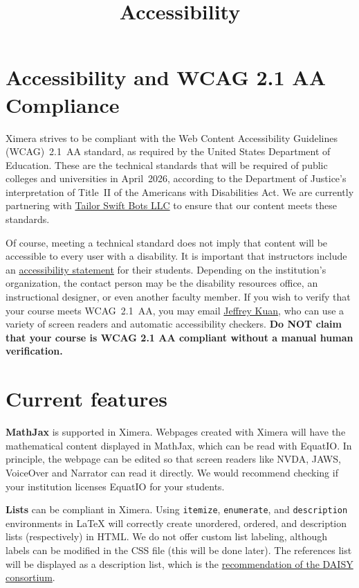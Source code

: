 \documentclass{ximera}
\title{Accessibility}
\begin{document}
\begin{abstract}
\end{abstract}
\maketitle

\section*{Accessibility and WCAG 2.1 AA Compliance}

Ximera strives to be compliant with the Web Content Accessibility Guidelines (WCAG)~2.1~AA standard, as required by the United States Department of Education. These are the technical standards that will be required of public colleges and universities in April~2026, according to the Department of Justice’s interpretation of Title~II of the Americans with Disabilities Act. We are currently partnering with \href{https://tailorswiftbot.com/}{Tailor Swift Bots LLC} to ensure that our content meets these standards.

Of course, meeting a technical standard does not imply that content will be accessible to every user with a disability. It is important that instructors include an \href{https://www.w3.org/WAI/planning/statements/}{accessibility statement} for their students. Depending on the institution’s organization, the contact person may be the disability resources office, an instructional designer, or even another faculty member. If you wish to verify that your course meets WCAG~2.1~AA, you may email \href{mailto:kuan.44@osu.edu}{Jeffrey Kuan}, who can use a variety of screen readers and automatic accessibility checkers. \textbf{Do NOT claim that your course is WCAG 2.1 AA compliant without a manual human verification.}

\section*{Current features}

\textbf{MathJax} is supported in Ximera.  
Webpages created with Ximera will have the mathematical content displayed in MathJax, which can be read with EquatIO. In principle, the webpage can be edited so that screen readers like NVDA, JAWS, VoiceOver and Narrator can read it directly. We would recommend checking if your institution licenses EquatIO for your students.

\medskip
\textbf{Lists} can be compliant in Ximera.  
Using \verb|itemize|, \verb|enumerate|, and \verb|description| environments in \LaTeX{} will correctly create unordered, ordered, and description lists (respectively) in HTML. We do not offer custom list labeling, although labels can be modified in the CSS file (this will be done later). The references list will be displayed as a description list, which is the \href{http://kb.daisy.org/publishing/docs/html/bibliographies.html}{recommendation of the DAISY consortium}.
\end{document}
